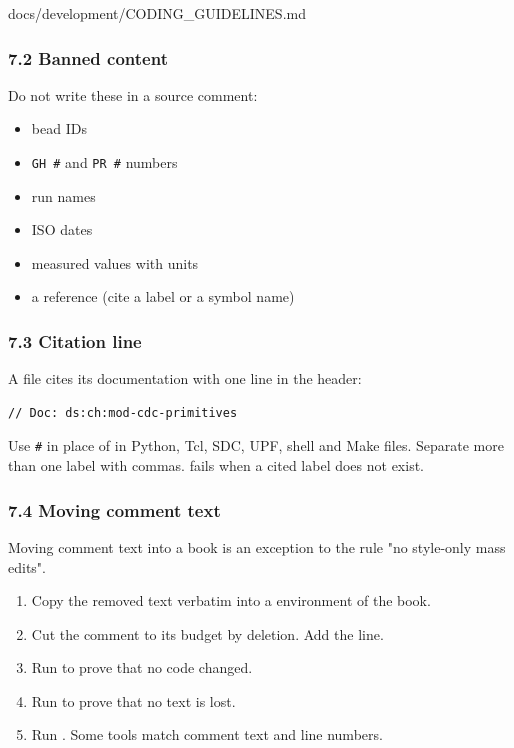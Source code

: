 \begin{relocated}{docs/development/CODING_GUIDELINES.md}
\subsubsection{7.2 Banned content}\label{um:guide:coding-guidelines:72-banned-content}

Do not write these in a source comment:

\begin{itemize}
\tightlist
\item
  bead IDs
\item
  \texttt{GH\ \#} and \texttt{PR\ \#} numbers
\item
  run names
\item
  ISO dates
\item
  measured values with units
\item
  a  reference (cite a  label or a symbol
  name)
\end{itemize}

\subsubsection{7.3 Citation line}\label{um:guide:coding-guidelines:73-citation-line}

A file cites its documentation with one line in the header:

\begin{lstlisting}[language={}]
// Doc: ds:ch:mod-cdc-primitives
\end{lstlisting}

Use \texttt{\#} in place of \code{//} in Python, Tcl, SDC, UPF, shell
and Make files. Separate more than one label with commas.
 fails when a cited label does not
exist.

\subsubsection{7.4 Moving comment text}\label{um:guide:coding-guidelines:74-moving-comment-text}

Moving comment text into a book is an exception to the rule "no
style-only mass edits".

\begin{enumerate}
\def\labelenumi{\arabic{enumi}.}
\tightlist
\item
  Copy the removed text verbatim into a  environment of
  the book.
\item
  Cut the comment to its budget by deletion. Add the  line.
\item
  Run  to prove that no code changed.
\item
  Run  to prove that no text is lost.
\item
  Run . Some tools match comment
  text and line numbers.
\end{enumerate}
\end{relocated}

